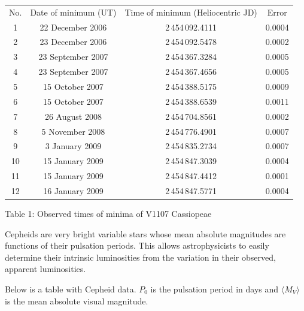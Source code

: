 \begin{center}
\begin{tabular}{cccc}
No. & Date of minimum (UT) & Time of minimum (Heliocentric JD) & Error \\
1 & 22 December 2006 & 2\,454\,092.4111 & 0.0004 \\
2 & 23 December 2006 & 2\,454\,092.5478 & 0.0002 \\
3 & 23 September 2007 & 2\,454\,367.3284 & 0.0005 \\
4 & 23 September 2007 & 2\,454\,367.4656 & 0.0005 \\
5 & 15 October 2007 & 2\,454\,388.5175 & 0.0009 \\
6 & 15 October 2007 & 2\,454\,388.6539 & 0.0011 \\
7 & 26 August 2008 & 2\,454\,704.8561 & 0.0002 \\
8 & 5 November 2008 & 2\,454\,776.4901 & 0.0007 \\
9 & 3 January 2009 & 2\,454\,835.2734 & 0.0007 \\
10 & 15 January 2009 & 2\,454\,847.3039 & 0.0004 \\
11 & 15 January 2009 & 2\,454\,847.4412 & 0.0001 \\
12 & 16 January 2009 & 2\,454\,847.5771 & 0.0004 \\
\end{tabular}

\medskip
Table 1: Observed times of minima of V1107 Cassiopeae
\end{center}

Cepheids are very bright variable stars whose mean absolute magnitudes are
functions of their pulsation periods. This allows astrophysicists to easily
determine their intrinsic luminosities from the variation in their observed,
apparent luminosities.

Below is a table with Cepheid data. $P_0$ is the pulsation period in days and
$\langle M_V\rangle$ is the mean absolute visual magnitude.

